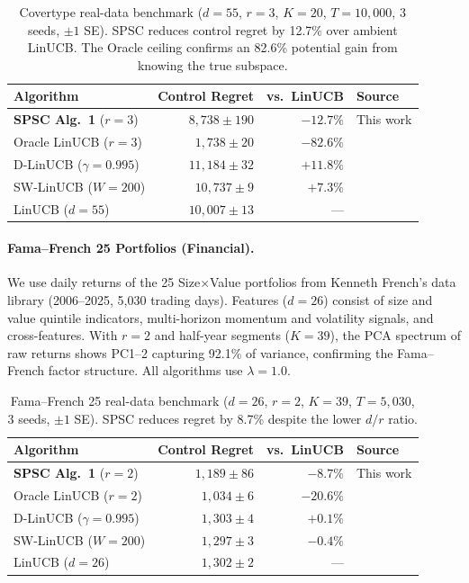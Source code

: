 \documentclass{article}
\begin{document}
\begin{table}[!htpb]
\centering
\small
\begin{tabular}{lrrl}
\toprule
Algorithm & Control Regret & vs.\ LinUCB & Source \\
\midrule
\textbf{SPSC Alg.~1} ($r{=}3$) & $8{,}738 \pm 190$ & $\mathbf{-12.7\%}$ & This work \\
Oracle LinUCB ($r{=}3$) & $1{,}738 \pm 20$ & $-82.6\%$ & \citet{jun2019bilinear} \\
D-LinUCB ($\gamma{=}0.995$) & $11{,}184 \pm 32$ & $+11.8\%$ & \citet{russac2019weighted} \\
SW-LinUCB ($W{=}200$) & $10{,}737 \pm 9$ & $+7.3\%$ & \citet{cheung2019learning} \\
LinUCB ($d{=}55$) & $10{,}007 \pm 13$ & --- & \citet{abbasi2011improved} \\
\bottomrule
\end{tabular}
\caption{Covertype real-data benchmark ($d{=}55$, $r{=}3$, $K{=}20$, $T{=}10{,}000$, 3 seeds, $\pm 1$ SE).
SPSC reduces control regret by 12.7\% over ambient LinUCB.
The Oracle ceiling confirms an 82.6\% potential gain from knowing the true subspace.}
\label{tab:covtype-real}
\end{table}

\paragraph{Fama--French 25 Portfolios (Financial).}
We use daily returns of the 25 Size$\times$Value portfolios from Kenneth French's data library (2006--2025, 5{,}030 trading days).
Features ($d = 26$) consist of size and value quintile indicators, multi-horizon momentum and volatility signals, and cross-features.
With $r = 2$ and half-year segments ($K = 39$), the PCA spectrum of raw returns shows PC1--2 capturing 92.1\% of variance, confirming the Fama--French factor structure.
All algorithms use $\lambda = 1.0$.

\begin{table}[!htpb]
\centering
\small
\begin{tabular}{lrrl}
\toprule
Algorithm & Control Regret & vs.\ LinUCB & Source \\
\midrule
\textbf{SPSC Alg.~1} ($r{=}2$) & $1{,}189 \pm 86$ & $\mathbf{-8.7\%}$ & This work \\
Oracle LinUCB ($r{=}2$) & $1{,}034 \pm 6$ & $-20.6\%$ & \citet{jun2019bilinear} \\
D-LinUCB ($\gamma{=}0.995$) & $1{,}303 \pm 4$ & $+0.1\%$ & \citet{russac2019weighted} \\
SW-LinUCB ($W{=}200$) & $1{,}297 \pm 3$ & $-0.4\%$ & \citet{cheung2019learning} \\
LinUCB ($d{=}26$) & $1{,}302 \pm 2$ & --- & \citet{abbasi2011improved} \\
\bottomrule
\end{tabular}
\caption{Fama--French 25 real-data benchmark ($d{=}26$, $r{=}2$, $K{=}39$, $T{=}5{,}030$, 3 seeds, $\pm 1$ SE).
SPSC reduces regret by 8.7\% despite the lower $d/r$ ratio.}
\label{tab:ff25-real}
\end{table}
\end{document}
